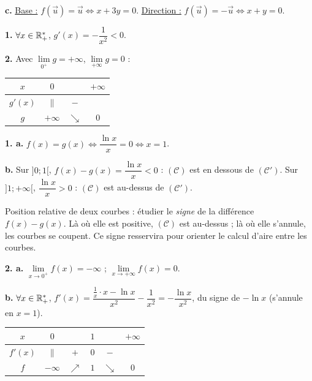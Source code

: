 \documentclass[11pt]{article}
\begin{document}
\textbf{c.} \underline{Base :} $f(\vec{u}) = \vec{u} \Leftrightarrow x + 3y = 0$. \underline{Direction :} $f(\vec{u}) = -\vec{u} \Leftrightarrow x + y = 0$.

\textbf{1.} $\forall x \in \mathbb{R}_+^*$, $g'(x) = -\dfrac{1}{x^2} < 0$.

\textbf{2.} Avec $\lim\limits_{0^+} g = +\infty$, $\lim\limits_{+\infty} g = 0$ :
\begin{center}\renewcommand{\arraystretch}{1.4}
\begin{tabular}{|c|ccc|}
\hline $x$ & $0$ & & $+\infty$ \\\hline $g'(x)$ & $\|$ & $-$ & \\\hline $g$ & $+\infty$ & $\searrow$ & $0$ \\\hline
\end{tabular}
\end{center}

\textbf{1. a.} $f(x) = g(x) \Leftrightarrow \dfrac{\ln x}{x} = 0 \Leftrightarrow x = 1$.

\textbf{b.} Sur $]0;1[$, $f(x) - g(x) = \dfrac{\ln x}{x} < 0$ : $(\mathcal{C})$ est en dessous de $(\mathcal{C}')$. Sur $]1;+\infty[$, $\dfrac{\ln x}{x} > 0$ : $(\mathcal{C})$ est au-dessus de $(\mathcal{C}')$.

\begin{methode}
Position relative de deux courbes : étudier le \emph{signe} de la
différence $f(x) - g(x)$. Là où elle est positive, $(\mathcal{C})$ est
au-dessus ; là où elle s'annule, les courbes se coupent. Ce signe
resservira pour orienter le calcul d'aire entre les courbes.
\end{methode}

\textbf{2. a.} $\lim\limits_{x\to 0^+} f(x) = -\infty$ ; $\lim\limits_{x\to+\infty} f(x) = 0$.

\textbf{b.} $\forall x \in \mathbb{R}_+^*$, $f'(x) = \dfrac{\frac{1}{x}\cdot x - \ln x}{x^2} - \dfrac{1}{x^2} = -\dfrac{\ln x}{x^2}$, du signe de $-\ln x$ (s'annule en $x = 1$).
\begin{center}\renewcommand{\arraystretch}{1.4}
\begin{tabular}{|c|ccccc|}
\hline $x$ & $0$ & & $1$ & & $+\infty$ \\\hline $f'(x)$ & $\|$ & $+$ & $0$ & $-$ & \\\hline $f$ & $-\infty$ & $\nearrow$ & $1$ & $\searrow$ & $0$ \\\hline
\end{tabular}
\end{center}
\end{document}
